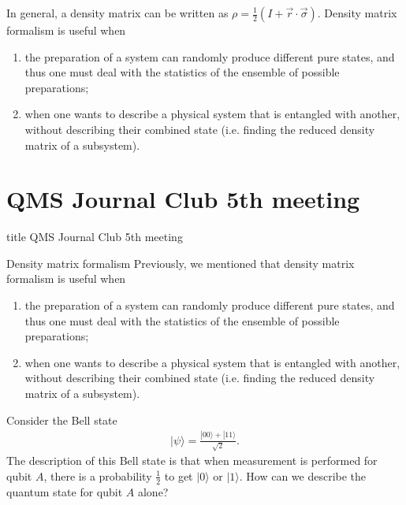 \documentclass{beamer}
\begin{document}
\begin{frame}
\justify
In general, a density matrix can be written as $\rho = \frac{1}{2} \left( I + \vec{r} \cdot \vec{\sigma} \right)$.
\vfill
Density matrix formalism is useful when
\begin{enumerate}
\item the preparation of a system can randomly produce different pure states, and thus one must deal with the statistics of the ensemble of possible preparations;
\item when one wants to describe a physical system that is entangled with another, without describing their combined state (i.e. finding the reduced density matrix of a subsystem).
\end{enumerate}
\end{frame}

\section{QMS Journal Club 5th meeting}
\begin{frame}
\vfill
\centering
\begin{beamercolorbox}[sep=8pt,center,shadow=true,rounded=true]{title}
\Large QMS Journal Club 5th meeting
\end{beamercolorbox}
\vfill
\end{frame}

\begin{frame}{Density matrix formalism}
\justify
Previously, we mentioned that density matrix formalism is useful when
\begin{enumerate}
\item the preparation of a system can randomly produce different pure states, and thus one must deal with the statistics of the ensemble of possible preparations;
\item when one wants to describe a physical system that is entangled with another, without describing their combined state (i.e. finding the reduced density matrix of a subsystem).
\end{enumerate}
\vfill
Consider the Bell state
\begin{align}
|\psi\rangle = \frac{|00\rangle + |11\rangle}{\sqrt{2}}.
\end{align}
\vfill
The description of this Bell state is that when measurement is performed for qubit $A$, there is a probability $\frac{1}{2}$ to get $|0\rangle$ or $|1\rangle$.
\vfill
How can we describe the quantum state for qubit $A$ alone?
\end{frame}
\end{document}
